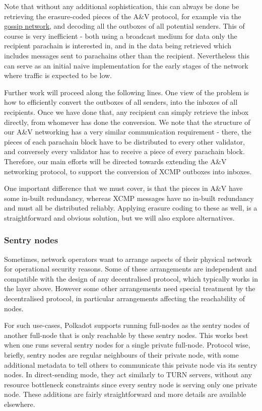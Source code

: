 \documentclass{article}
\begin{document}
Note that without any additional sophistication, this can always be done be
retrieving the erasure-coded pieces of the A\&V protocol, for example via the
\hyperref[sec:gossiping]{gossip network}, and decoding all the outboxes of all
potential senders. This of course is very inefficient - both using a broadcast
medium for data only the recipient parachain is interested in, and in the data
being retrieved which includes messages sent to parachains other than the
recipient. Nevertheless this can serve as an initial naive implementation for
the early stages of the network where traffic is expected to be low.

Further work will proceed along the following lines. One view of the problem is
how to efficiently convert the outboxes of all senders, into the inboxes of all
recipients. Once we have done that, any recipient can simply retrieve the inbox
directly, from whomever has done the conversion. We note that the structure of
our A\&V networking has a very similar communication requirement - there, the
pieces of each parachain block have to be distributed to every other validator,
and conversely every validator has to receive a piece of every parachain block.
Therefore, our main efforts will be directed towards extending the A\&V
networking protocol, to support the conversion of XCMP outboxes into inboxes.

One important difference that we must cover, is that the pieces in A\&V have
some in-built redundancy, whereas XCMP messages have no in-built redundancy and
must all be distributed reliably. Applying erasure coding to these as well, is
a straightforward and obvious solution, but we will also explore alternatives.

\subsubsection{Sentry nodes} \label{sec:net_sentry}

Sometimes, network operators want to arrange aspects of their physical network
for operational security reasons. Some of these arrangements are independent
and compatible with the design of any decentralised protocol, which typically
works in the layer above. However some other arrangements need special
treatment by the decentralised protocol, in particular arrangements affecting
the reachability of nodes.

For such use-cases, Polkadot supports running full-nodes as the sentry nodes of
another full-node that is only reachable by these sentry nodes. This works best
when one runs several sentry nodes for a single private full-node. Protocol
wise, briefly, sentry nodes are regular neighbours of their private node, with
some additional metadata to tell others to communicate this private node via
its sentry nodes. In direct-sending mode, they act similarly to TURN servers,
without any resource bottleneck constraints since every sentry node is serving
only one private node. These additions are fairly straightforward and more
details are available elsewhere.
\end{document}
